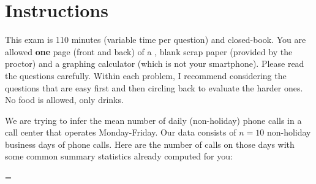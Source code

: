 \documentclass[12pt]{article}
\begin{document}
\section*{Instructions}
This exam is 110 minutes (variable time per question) and closed-book. You are allowed \textbf{one} page (front and back) of a , blank scrap paper (provided by the proctor) and a graphing calculator (which is not your smartphone). Please read the questions carefully. Within each problem, I recommend considering the questions that are easy first and then circling back to evaluate the harder ones. No food is allowed, only drinks. %

\pagebreak

\problem We are trying to infer the mean number of daily (non-holiday) phone calls in a call center that operates Monday-Friday. Our data consists of $n = 10$ non-holiday business days of phone calls. Here are the number of calls on those days with some common summary statistics already computed for you:

\beqn
\x = ~
\eeqn
\end{document}
